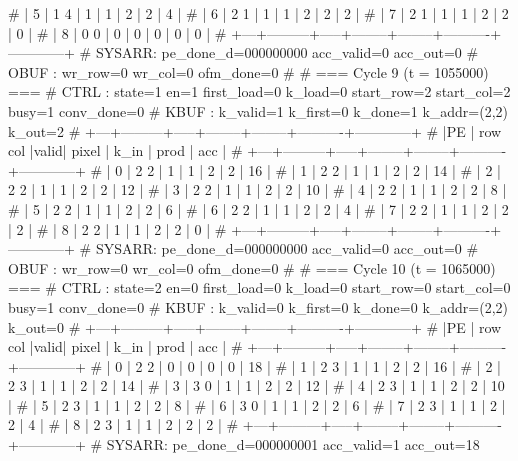# | 5 |   1   4 |  1  |      1 |      2 |        2 |          4 |
# | 6 |   2   1 |  1  |      1 |      2 |        2 |          2 |
# | 7 |   2   1 |  1  |      1 |      2 |        2 |          0 |
# | 8 |   0   0 |  0  |      0 |      0 |        0 |          0 |
# +---+---------+-----+--------+--------+----------+------------+
# SYSARR: pe_done_d=000000000 acc_valid=0 acc_out=0
# OBUF : wr_row=0 wr_col=0 ofm_done=0
# 
# === Cycle 9  (t = 1055000) ===
# CTRL : state=1 en=1 first_load=0 k_load=0 start_row=2 start_col=2 busy=1 conv_done=0
# KBUF : k_valid=1 k_first=0 k_done=1 k_addr=(2,2) k_out=2
# +---+---------+-----+--------+--------+----------+------------+
# |PE | row col |valid| pixel  |  k_in  |   prod   |    acc     |
# +---+---------+-----+--------+--------+----------+------------+
# | 0 |   2   2 |  1  |      1 |      2 |        2 |         16 |
# | 1 |   2   2 |  1  |      1 |      2 |        2 |         14 |
# | 2 |   2   2 |  1  |      1 |      2 |        2 |         12 |
# | 3 |   2   2 |  1  |      1 |      2 |        2 |         10 |
# | 4 |   2   2 |  1  |      1 |      2 |        2 |          8 |
# | 5 |   2   2 |  1  |      1 |      2 |        2 |          6 |
# | 6 |   2   2 |  1  |      1 |      2 |        2 |          4 |
# | 7 |   2   2 |  1  |      1 |      2 |        2 |          2 |
# | 8 |   2   2 |  1  |      1 |      2 |        2 |          0 |
# +---+---------+-----+--------+--------+----------+------------+
# SYSARR: pe_done_d=000000000 acc_valid=0 acc_out=0
# OBUF : wr_row=0 wr_col=0 ofm_done=0
# 
# === Cycle 10  (t = 1065000) ===
# CTRL : state=2 en=0 first_load=0 k_load=0 start_row=0 start_col=0 busy=1 conv_done=0
# KBUF : k_valid=0 k_first=0 k_done=0 k_addr=(2,2) k_out=0
# +---+---------+-----+--------+--------+----------+------------+
# |PE | row col |valid| pixel  |  k_in  |   prod   |    acc     |
# +---+---------+-----+--------+--------+----------+------------+
# | 0 |   2   2 |  0  |      0 |      0 |        0 |         18 |
# | 1 |   2   3 |  1  |      1 |      2 |        2 |         16 |
# | 2 |   2   3 |  1  |      1 |      2 |        2 |         14 |
# | 3 |   3   0 |  1  |      1 |      2 |        2 |         12 |
# | 4 |   2   3 |  1  |      1 |      2 |        2 |         10 |
# | 5 |   2   3 |  1  |      1 |      2 |        2 |          8 |
# | 6 |   3   0 |  1  |      1 |      2 |        2 |          6 |
# | 7 |   2   3 |  1  |      1 |      2 |        2 |          4 |
# | 8 |   2   3 |  1  |      1 |      2 |        2 |          2 |
# +---+---------+-----+--------+--------+----------+------------+
# SYSARR: pe_done_d=000000001 acc_valid=1 acc_out=18
